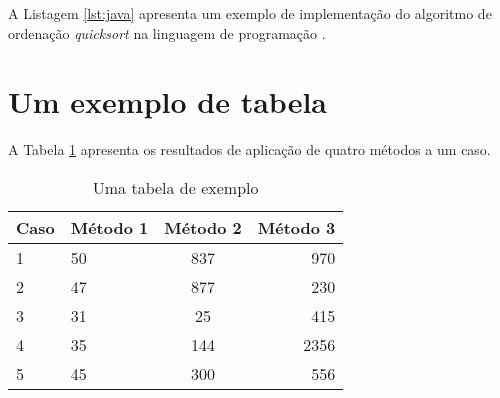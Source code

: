 A Listagem \ref{lst:java} apresenta um exemplo de implementação do algoritmo de ordenação \textit{quicksort} na linguagem de programação \Java{}.






\pagebreak %
\section{Um exemplo de tabela}

A Tabela \ref{tab:caso} apresenta os resultados de aplicação de quatro métodos a um caso.

\begin{table}[htb]
\caption{Uma tabela de exemplo} %
\centering %
\begin{tabular}{l l c r} %
\hline\hline %
Caso & Método 1 & Método 2 & Método 3 \\ [0.5ex] %
\hline %
1 & 50 & 837 & 970 \\ %
2 & 47 & 877 & 230 \\
3 & 31 & 25 & 415 \\
4 & 35 & 144 & 2356 \\
5 & 45 & 300 & 556 \\ [1ex] %
\hline %
\end{tabular}
\label{tab:caso} %
\end{table}





